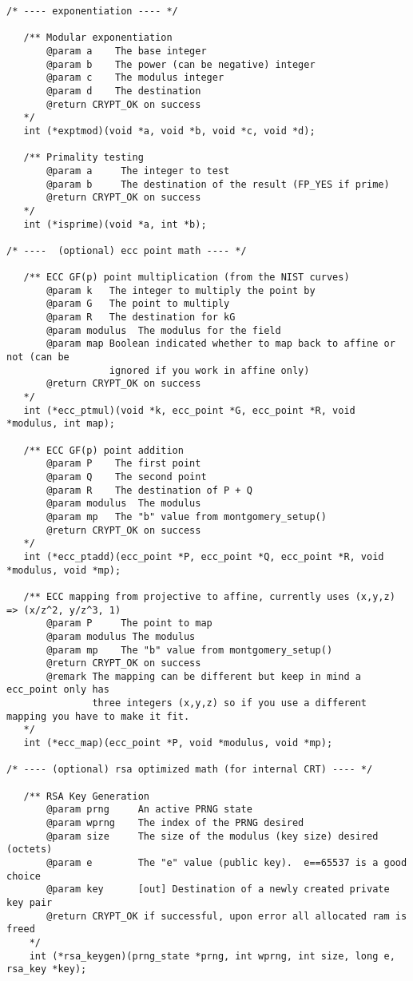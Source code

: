 \documentclass[a4paper]{book}
\begin{document}
\begin{small}
\begin{verbatim}
/* ---- exponentiation ---- */

   /** Modular exponentiation
       @param a    The base integer
       @param b    The power (can be negative) integer
       @param c    The modulus integer
       @param d    The destination
       @return CRYPT_OK on success
   */
   int (*exptmod)(void *a, void *b, void *c, void *d);

   /** Primality testing
       @param a     The integer to test
       @param b     The destination of the result (FP_YES if prime)
       @return CRYPT_OK on success
   */
   int (*isprime)(void *a, int *b);

/* ----  (optional) ecc point math ---- */

   /** ECC GF(p) point multiplication (from the NIST curves)
       @param k   The integer to multiply the point by
       @param G   The point to multiply
       @param R   The destination for kG  
       @param modulus  The modulus for the field
       @param map Boolean indicated whether to map back to affine or not (can be 
                  ignored if you work in affine only)
       @return CRYPT_OK on success
   */
   int (*ecc_ptmul)(void *k, ecc_point *G, ecc_point *R, void *modulus, int map);

   /** ECC GF(p) point addition 
       @param P    The first point
       @param Q    The second point
       @param R    The destination of P + Q
       @param modulus  The modulus
       @param mp   The "b" value from montgomery_setup()
       @return CRYPT_OK on success
   */
   int (*ecc_ptadd)(ecc_point *P, ecc_point *Q, ecc_point *R, void *modulus, void *mp);

   /** ECC mapping from projective to affine, currently uses (x,y,z) => (x/z^2, y/z^3, 1)
       @param P     The point to map
       @param modulus The modulus
       @param mp    The "b" value from montgomery_setup()
       @return CRYPT_OK on success
       @remark The mapping can be different but keep in mind a ecc_point only has 
               three integers (x,y,z) so if you use a different mapping you have to make it fit.
   */
   int (*ecc_map)(ecc_point *P, void *modulus, void *mp);

/* ---- (optional) rsa optimized math (for internal CRT) ---- */

   /** RSA Key Generation 
       @param prng     An active PRNG state
       @param wprng    The index of the PRNG desired
       @param size     The size of the modulus (key size) desired (octets)
       @param e        The "e" value (public key).  e==65537 is a good choice
       @param key      [out] Destination of a newly created private key pair
       @return CRYPT_OK if successful, upon error all allocated ram is freed
    */
    int (*rsa_keygen)(prng_state *prng, int wprng, int size, long e, rsa_key *key);


\end{verbatim}
\end{small}
\end{document}
